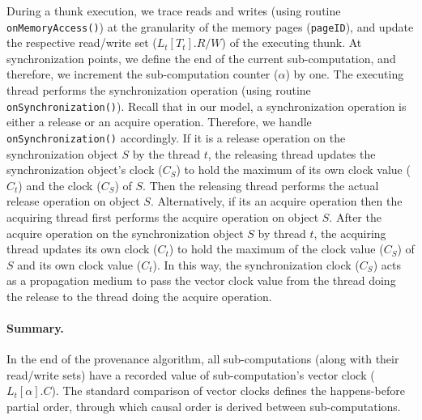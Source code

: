 During a thunk execution, we trace reads and writes  (using routine {\tt onMemoryAccess()}) at the granularity of the
memory pages ({\tt pageID}), and update the respective read/write set
($L_t[T_t].R/W$) of the executing thunk.
At synchronization points, we define the end of the current sub-computation, and therefore, we increment the sub-computation  counter ($\alpha$) by one. The executing thread performs the synchronization operation (using routine {\tt onSynchronization()}). Recall that in our model, a synchronization operation is either a release or an acquire operation. Therefore, we handle {\tt onSynchronization()} accordingly. If it is a release operation on the synchronization object $S$ by the thread $t$, the
releasing thread updates the synchronization object's clock ($C_S$) to
hold the maximum of its own clock value ($C_{t}$) and the clock  ($C_S$) of $S$. Then the releasing thread performs the actual release operation  on object $S$. Alternatively, if its an acquire operation then the acquiring thread first performs the acquire  operation on object $S$. After the acquire operation on the synchronization object $S$ by
thread $t$, the acquiring thread updates its own clock ($C_{t}$) to hold the
maximum of the clock value  ($C_S$) of $S$  and its own clock value ($C_{t}$).
In this way, the synchronization clock ($C_S$) acts as a propagation medium to pass the
vector clock value from the thread doing the release to the thread doing the acquire operation.



\paragraph{Summary.} In the end of the provenance algorithm, all sub-computations (along with their read/write sets) have a recorded value of sub-computation's vector clock ($L_t[\alpha].C$). The standard comparison of vector clocks defines the  happens-before partial order, through which causal order is derived between sub-computations.


